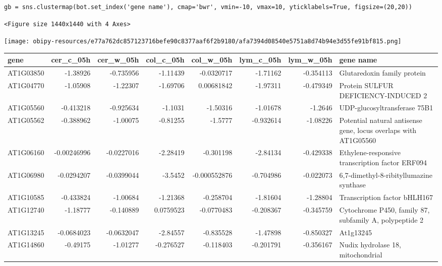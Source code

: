 \documentclass[11pt]{article}
\begin{document}
\begin{verbatim}
gb = sns.clustermap(bot.set_index('gene name'), cmap='bwr', vmin=-10, vmax=10, yticklabels=True, figsize=(20,20))
\end{verbatim}

\begin{verbatim}
<Figure size 1440x1440 with 4 Axes>
\end{verbatim}


\begin{center}
\texttt{[image: obipy-resources/e77a762dc857123716befe90c8377aaf6f2b9180/afa7394d08540e5751a8d74b94e3d55fe91bf815.png]}
\end{center}


\begin{center}
\begin{tabular}{lrrrrrrl}
gene & cer\_c\_05h & cer\_w\_05h & col\_c\_05h & col\_w\_05h & lym\_c\_05h & lym\_w\_05h & gene name\\
\hline
AT1G03850 & -1.38926 & -0.735956 & -1.11439 & -0.0320717 & -1.71162 & -0.354113 & Glutaredoxin family protein\\
AT1G04770 & -1.05908 & -1.22307 & -1.69706 & 0.00681842 & -1.97311 & -0.479349 & Protein SULFUR DEFICIENCY-INDUCED 2\\
AT1G05560 & -0.413218 & -0.925634 & -1.1031 & -1.50316 & -1.01678 & -1.2646 & UDP-glucosyltransferase 75B1\\
AT1G05562 & -0.388962 & -1.00075 & -0.81255 & -1.5777 & -0.932614 & -1.08226 & Potential natural antisense gene, locus overlaps with AT1G05560\\
AT1G06160 & -0.00246996 & -0.0227016 & -2.28419 & -0.301198 & -2.84134 & -0.429338 & Ethylene-responsive transcription factor ERF094\\
AT1G06980 & -0.0294207 & -0.0399044 & -3.5452 & -0.000552876 & -0.704986 & -0.022073 & 6,7-dimethyl-8-ribityllumazine synthase\\
AT1G10585 & -0.433824 & -1.00684 & -1.21368 & -0.258704 & -1.81604 & -1.28804 & Transcription factor bHLH167\\
AT1G12740 & -1.18777 & -0.140889 & 0.0759523 & -0.0770483 & -0.208367 & -0.345759 & Cytochrome P450, family 87, subfamily A, polypeptide 2\\
AT1G13245 & -0.0684023 & -0.0632047 & -2.84557 & -0.835528 & -1.47898 & -0.850327 & At1g13245\\
AT1G14860 & -0.49175 & -1.01277 & -0.276527 & -0.118403 & -0.201791 & -0.356167 & Nudix hydrolase 18, mitochondrial\\

\end{tabular}
\end{center}
\end{document}
